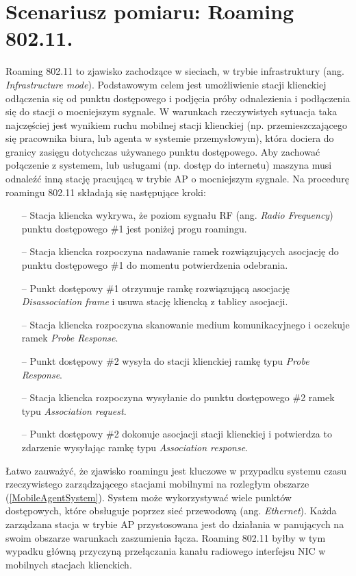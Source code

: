 \section{Scenariusz pomiaru: Roaming 802.11.}
Roaming 802.11 to zjawisko zachodzące w sieciach, w trybie infrastruktury (ang. \emph{Infrastructure mode}). Podstawowym celem jest umożliwienie stacji klienckiej odłączenia się od punktu dostępowego i podjęcia próby odnalezienia i podłączenia się do stacji o mocniejszym sygnale. W warunkach rzeczywistych sytuacja taka najczęściej jest wynikiem ruchu mobilnej stacji klienckiej (np. przemieszczającego się pracownika biura, lub agenta w systemie przemysłowym), która dociera do granicy zasięgu dotychczas używanego punktu dostępowego. Aby zachować połączenie z systemem, lub usługami (np. dostęp do internetu) maszyna musi odnaleźć inną stację pracującą w trybie AP o mocniejszym sygnale. Na procedurę roamingu 802.11 składają się następujące kroki:
\begin{itemize}
\item[--] Stacja kliencka wykrywa, że poziom sygnału RF (ang. \emph{Radio Frequency})
punktu dostępowego \#1 jest poniżej progu roamingu.
\item[--] Stacja kliencka rozpoczyna nadawanie ramek rozwiązujących asocjację do punktu dostępowego \#1 do momentu potwierdzenia odebrania.
\item[--] Punkt dostępowy \#1 otrzymuje ramkę rozwiązującą asocjację \emph{Disassociation frame} i usuwa stację kliencką z tablicy asocjacji.
\item[--] Stacja kliencka rozpoczyna skanowanie medium komunikacyjnego i oczekuje ramek \emph{Probe Response}.
\item[--] Punkt dostępowy \#2 wysyła do stacji klienckiej ramkę typu \emph{Probe Response}.
\item[--] Stacja kliencka rozpoczyna wysyłanie do punktu dostępowego \#2 ramek typu \emph{Association request}.
\item[--] Punkt dostępowy \#2 dokonuje asocjacji stacji klienckiej i potwierdza to zdarzenie wysyłając ramkę typu \emph{Association response}.
\end{itemize}

Łatwo zauważyć, że zjawisko roamingu jest kluczowe w przypadku systemu czasu rzeczywistego zarządzającego stacjami mobilnymi na rozległym obszarze (\ref{MobileAgentSystem}). System może wykorzystywać wiele punktów dostępowych, które obsługuje poprzez sieć przewodową (ang. \emph{Ethernet}). Każda zarządzana stacja w trybie AP przystosowana jest do działania w panujących na swoim obszarze warunkach zaszumienia łącza. Roaming 802.11 byłby w tym wypadku główną przyczyną przełączania kanału radiowego interfejsu NIC w mobilnych stacjach klienckich. 

